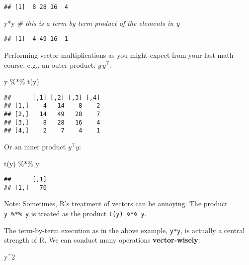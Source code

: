 \documentclass[
]{book}
\newenvironment{Shaded}{\begin{snugshade}}{\end{snugshade}}
\newcommand{\CommentTok}[1]{\textcolor[rgb]{0.56,0.35,0.01}{\textit{#1}}}
\newcommand{\DecValTok}[1]{\textcolor[rgb]{0.00,0.00,0.81}{#1}}
\newcommand{\FunctionTok}[1]{\textcolor[rgb]{0.00,0.00,0.00}{#1}}
\newcommand{\NormalTok}[1]{#1}
\newcommand{\SpecialCharTok}[1]{\textcolor[rgb]{0.00,0.00,0.00}{#1}}
\begin{document}
\begin{verbatim}
## [1]  8 28 16  4
\end{verbatim}

\begin{Shaded}
\begin{Highlighting}[]
\NormalTok{y}\SpecialCharTok{*}\NormalTok{y }\CommentTok{\# this is a term by term product of the elements in y}
\end{Highlighting}
\end{Shaded}

\begin{verbatim}
## [1]  4 49 16  1
\end{verbatim}

Performing vector multiplications as you might expect from your last math-course, e.g., an outer product: \(y\,y^\top\):

\begin{Shaded}
\begin{Highlighting}[]
\NormalTok{y }\SpecialCharTok{\%*\%} \FunctionTok{t}\NormalTok{(y)}
\end{Highlighting}
\end{Shaded}

\begin{verbatim}
##      [,1] [,2] [,3] [,4]
## [1,]    4   14    8    2
## [2,]   14   49   28    7
## [3,]    8   28   16    4
## [4,]    2    7    4    1
\end{verbatim}

Or an inner product \(y^\top y\):

\begin{Shaded}
\begin{Highlighting}[]
\FunctionTok{t}\NormalTok{(y) }\SpecialCharTok{\%*\%}\NormalTok{ y}
\end{Highlighting}
\end{Shaded}

\begin{verbatim}
##      [,1]
## [1,]   70
\end{verbatim}

Note: Sometimes, R's treatment of vectors can be annoying. The product \texttt{y\ \%*\%\ y} is treated as the product \texttt{t(y)\ \%*\%\ y}.

The term-by-term execution as in the above example, \texttt{y*y}, is actually a central strength of R. We can conduct many operations \textbf{vector-wisely}:

\begin{Shaded}
\begin{Highlighting}[]
\NormalTok{y}\SpecialCharTok{\^{}}\DecValTok{2}
\end{Highlighting}
\end{Shaded}
\end{document}
